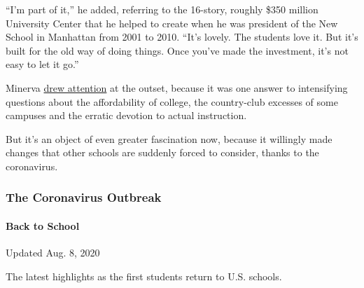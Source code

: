 ``I'm part of it,'' he added, referring to the 16-story, roughly \$350
million University Center that he helped to create when he was president
of the New School in Manhattan from 2001 to 2010. ``It's lovely. The
students love it. But it's built for the old way of doing things. Once
you've made the investment, it's not easy to let it go.''

Minerva
\href{https://www.theatlantic.com/magazine/archive/2014/09/the-future-of-college/375071/}{drew
attention} at the outset, because it was one answer to intensifying
questions about the affordability of college, the country-club excesses
of some campuses and the erratic devotion to actual instruction.

But it's an object of even greater fascination now, because it willingly
made changes that other schools are suddenly forced to consider, thanks
to the coronavirus.

\hypertarget{the-coronavirus-outbreak}{%
\subsubsection{The Coronavirus
Outbreak}\label{the-coronavirus-outbreak}}

\hypertarget{back-to-school}{%
\paragraph{Back to School}\label{back-to-school}}

Updated Aug. 8, 2020

The latest highlights as the first students return to U.S. schools.

